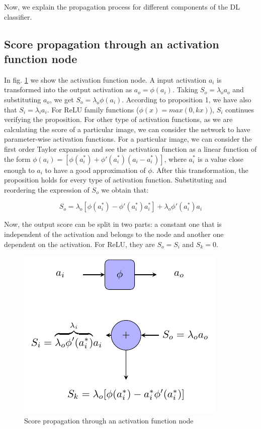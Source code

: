 Now, we explain the propagation process for different components of the DL classifier.

\subsection{Score propagation through an activation function node} 

In fig. \ref{score:fig:score_af} we show the activation function node. A input activation $a_i$ is transformed into the output activation as $a_o = \phi(a_i)$. Taking $S_o = \lambda_o a_o$ and substituting $a_o$, we get $S_o = \lambda_o \phi(a_i)$. According to proposition 1, we have also that $S_i = \lambda_i a_i$. For ReLU family functions ($\phi(x) = max(0, kx)$), $S_i$ continues verifying the proposition. For other type of activation functions, as we are calculating the score of a particular image, we can consider the network to have parameter-wise activation functions. For a particular image, we can consider the first order Taylor expansion and see the activation function as a linear function of the form $\phi(a_i) = [\phi(a^*_i) + \phi'(a^*_i)(a_i - a^*_i)]$, where $a^*_i$ is a value close enough to $a_i$ to have a good approximation of $\phi$. After this transformation, the proposition holds for every type of activation function. Substituting and reordering the expression of $S_o$ we obtain that:

\begin{equation}
S_o = \lambda_o[\phi(a^*_i) - \phi'(a^*_i)a^*_i] + \lambda_o \phi'(a^*_i)a_i
\end{equation}

Now, the output score can be split in two parts: a constant one that is independent of the activation and belongs to the node and another one dependent on the activation. For ReLU, they are $S_o = S_i$ and $S_k = 0$.

\begin{figure}[!ht]
	\centering
	\includegraphics{Figures/chapter_interpretation/figures/score_af.pdf}
	\caption{Score propagation through an activation function node}
	\label{score:fig:score_af}
\end{figure}

